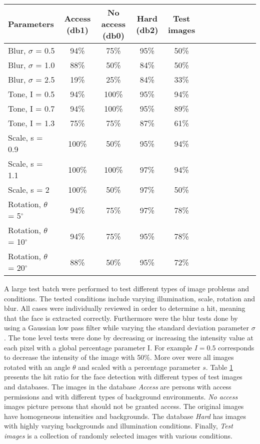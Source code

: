 \begin{table}[H]
\small
  \label{tb:result}
\begin{tabular}{l*{10}{c}r}
\hline
Parameters & Access (db1) & No access (db0) & Hard (db2) & Test images \\
\hline
Blur, $\sigma$ = 0.5  & 94\% 	& 75\% 		& 95\% 		& 50\%  \\ \hline
Blur, $\sigma$ = 1.0  & 88\% 		& 50\% 		& 84\% 	& 50\% \\ \hline
Blur, $\sigma$ = 2.5  & 19\% 	& 25\% 		& 84\% 		& 33\% \\ \hline
Tone, I = 0.5  		& 94\% 	& 100\%	 		& 95\%		& 94\% \\ \hline
Tone, I = 0.7  		& 94\%		& 100\%   	    & 95\% 	& 89\% 	\\ \hline
Tone, I = 1.3  		& 75\%		& 75\%		& 87\% 	& 61\% 	 \\ \hline
Scale, s = 0.9 		& 100\% 		& 50\% 		& 95\% 	& 94\% 	 \\ \hline
Scale, s = 1.1  		& 100\% 		& 100\% 		& 97\% 	& 94\%		  \\ \hline
Scale, s = 2  			& 100\% 		& 50\%		& 97\% 	& 50\%		  \\ \hline
Rotation, $\theta$ = 5$^{\circ}$  	& 94\% 	& 75\%		& 97\% 		& 78\% 	 \\ \hline
Rotation, $\theta$ = 10$^{\circ}$   & 94\% 	& 75\%		& 95\% 		& 78\% 	 \\ \hline
Rotation, $\theta$ = 20$^{\circ}$  & 88\% 		& 50\%		& 95\% 	& 72\% 	 \\ \hline
\end{tabular}
\end{table}

A large test batch were performed to test different types of image problems and conditions. The tested conditions include varying illumination, scale, rotation and blur. All cases were individually reviewed in order to determine a hit, meaning that the face is extracted correctly. Furthermore were the blur tests done by using a Gaussian low pass filter while varying the standard deviation parameter $\sigma$.
The tone level tests were done by decreasing or increasing the intensity value at each pixel with a global percentage parameter I. For example $I = 0.5$ corresponds to decrease the intensity of the image with 50\%.
More over were all images rotated with an angle $\theta$ and scaled with a percentage parameter $s$.
\newline
\indent Table \ref{tb:result} presents the hit ratio for the face detection with different types of test images and databases.
The images in the database \textit{Access} are persons with access permissions and with different types of background environments.
\textit{No access} images picture persons that should not be granted access. The original images have homogeneous intensities and backgrounds.
The database \textit{Hard} has images with highly varying backgrounds and illumination conditions. Finally, \textit{Test images} is a collection of randomly selected images with various conditions.
